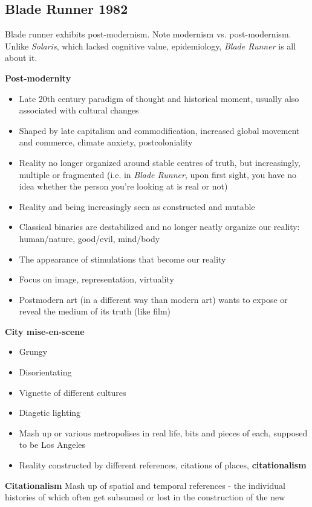 \documentclass[11pt,fleqn]{book} %
\begin{document}
\subsection{Blade Runner 1982}
\begin{remark}
    Blade runner exhibits post-modernism. Note modernism vs. post-modernism. Unlike \textit{Solaris}, which lacked cognitive value, epidemiology, \textit{Blade Runner} is all about it.
\end{remark}
\textbf{Post-modernity}
\begin{itemize}
    \item Late 20th century paradigm of thought and historical moment, usually also associated with cultural changes
    \item Shaped by late capitalism and commodification, increased global movement and commerce, climate anxiety, postcoloniality
    \item Reality no longer organized around stable centres of truth, but increasingly, multiple or fragmented (i.e. in \textit{Blade Runner}, upon first sight, you have no idea whether the person you're looking at is real or not)
    \item Reality and being increasingly seen as constructed and mutable
    \item Classical binaries are destabilized and no longer neatly organize our reality: human/nature, good/evil, mind/body
    \item The appearance of stimulations that become our reality
    \item Focus on image, representation, virtuality
    \item Postmodern art (in a different way than modern art) wants to expose or reveal the medium of its truth (like film)
\end{itemize}
\textbf{City mise-en-scene}
\begin{itemize}
    \item Grungy
    \item Disorientating
    \item Vignette of different cultures
    \item Diagetic lighting
    \item Mash up or various metropolises in real life, bits and pieces of each, supposed to be Los Angeles 
    \item Reality constructed by different references, citations of places, \textbf{citationalism}
\end{itemize}
\textbf{Citationalism} Mash up of spatial and temporal references - the individual histories of which often get subsumed or lost in the construction of the new\
\end{document}
